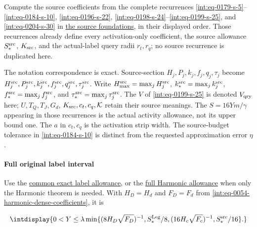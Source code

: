 Compute the source coefficients from the complete recurrences \eqref{int:eq-0179-s-5}--\allowbreak \eqref{int:eq-0184-s-10}, \eqref{int:eq-0196-s-22}, \eqref{int:eq-0198-s-24}--\allowbreak \eqref{int:eq-0199-s-25}, and \eqref{int:eq-0204-s-30} in \hyperref[int:source-explicit-recurrences]{the source foundations}, in their displayed order. Those recurrences already define every activation-only coefficient, the source allowance \(S_*^{\rm src}\), \(K_{\rm src}\), and the actual-label query radii \(r_t,\allowbreak r_q\); no source recurrence is duplicated here.



The notation correspondence is exact. Source-section \(H_j,\allowbreak P_j,\allowbreak k_j,\allowbreak f_j,\allowbreak q_j,\allowbreak \tau_j\) become \(H_j^{\rm src},\allowbreak P_j^{\rm src},\allowbreak k_j^{\rm src},\allowbreak f_j^{\rm src},\allowbreak q_j^{\rm src},\allowbreak \tau_j^{\rm src}\). Write \(H_{\max}^{\rm src}=\max_jH_j^{\rm src}\), \(k_*^{\rm src}=\max_jk_j^{\rm src}\), \(f_*^{\rm src}=\max_jf_j^{\rm src}\), and \(\tau_*^{\rm src}=\max_j\tau_j^{\rm src}\). The \(V\) of \eqref{int:eq-0199-s-25} is denoted \(V_{\rm qry}\) here; \(U,\allowbreak T_Q,\allowbreak T_J,\allowbreak G_d\), \(K_{\rm src},\allowbreak c_t,\allowbreak c_q,\allowbreak \mathcal K\) retain their source meanings. The \(S=16Ym/\gamma\) appearing in those recurrences is the actual activity allowance, not its upper bound one. The \(a\) in \(c_t,\allowbreak c_q\) is the activation strip width. The source-budget tolerance in \eqref{int:eq-0184-s-10} is distinct from the requested approximation error \(\eta\).


\paragraph{Full original label interval}
\label{int:setup-orders-detail-3}
\mbox{}\par\smallskip


Use the \hyperref[int:detailed-statements]{common exact label allowance}, or the \hyperref[int:harmonic-fitting-coefficients]{full Harmonic allowance} when only the Harmonic theorem is needed. With \(H_D=H_d\) and \(F_D=F_d\) from \eqref{int:eq-0054-harmonic-dense-coefficients}, it is


\begingroup\renewcommand{\theHequation}{intdisplay.236}
\begin{equation*}
\intdisplay{
0<Y\le\lambda\min\{(8H_D\sqrt{F_D})^{-1},
S_*^{\rm Leg}/8,(16H_c\sqrt{F_c})^{-1},S_*^{\rm src}/16\}.
}
\end{equation*}
\endgroup

